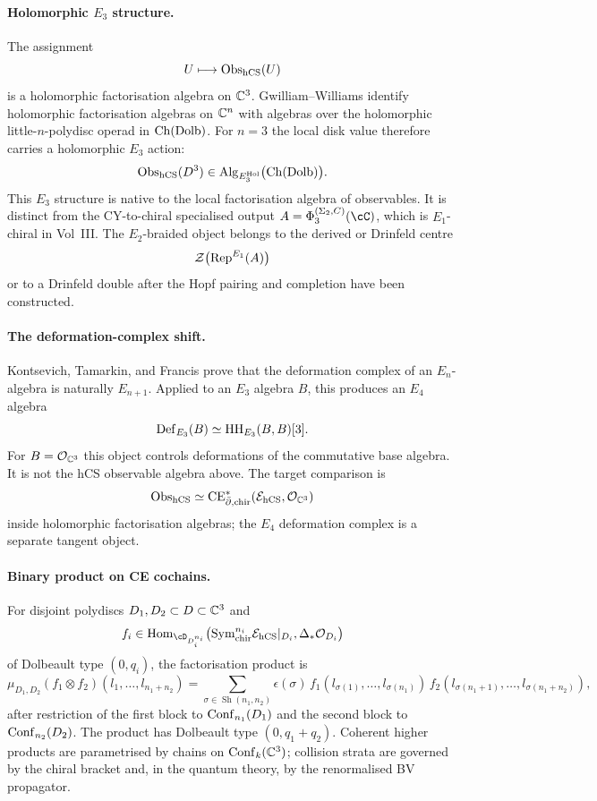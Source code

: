 \paragraph{Holomorphic $E_3$ structure.}
The assignment
\[
  U\longmapsto \mathrm{Obs}_{\mathrm{hCS}}(U)
\]
is a holomorphic factorisation algebra on $\mathbb{C}^3$.  Gwilliam--Williams
identify holomorphic factorisation algebras on $\mathbb{C}^n$ with algebras over
the holomorphic little-$n$-polydisc operad in $\mathrm{Ch}(\mathrm{Dolb})$.  For $n=3$
the local disk value therefore carries a holomorphic $E_3$ action:
\[
  \mathrm{Obs}_{\mathrm{hCS}}(D^3)\in
  \mathrm{Alg}_{E^{\mathrm{Hol}}_3}\bigl(\mathrm{Ch}(\mathrm{Dolb})\bigr).
\]
This $E_3$ structure is native to the local factorisation algebra of
observables.  It is distinct from the CY-to-chiral specialised output
$A=\Phi_3^{(\Sigma_2,C)}(\cC)$, which is $E_1$-chiral in Vol~III.  The
$E_2$-braided object belongs to the derived or Drinfeld centre
\[
  \mathcal{Z}\bigl(\mathrm{Rep}^{E_1}(A)\bigr)
\]
or to a Drinfeld double after the Hopf pairing and completion have been
constructed.

\paragraph{The deformation-complex shift.}
Kontsevich, Tamarkin, and Francis prove that the deformation complex of an
$E_n$-algebra is naturally $E_{n+1}$.  Applied to an $E_3$ algebra $B$,
this produces an $E_4$ algebra
\[
  \mathrm{Def}_{E_3}(B)\simeq \mathrm{HH}_{E_3}(B,B)[3].
\]
For $B=\mathcal{O}_{\mathbb{C}^3}$ this object controls deformations of the commutative
base algebra.  It is not the hCS observable algebra above.  The
target comparison is
\[
  \mathrm{Obs}_{\mathrm{hCS}}
  \simeq
  \mathrm{CE}^*_{\bar\partial,\mathrm{chir}}(\mathcal{E}_{\mathrm{hCS}},\mathcal{O}_{\mathbb{C}^3})
\]
inside holomorphic factorisation algebras; the $E_4$ deformation complex
is a separate tangent object.

\paragraph{Binary product on CE cochains.}
For disjoint polydiscs $D_1,D_2\subset D\subset\mathbb{C}^3$ and
\[
 f_i\in
 \Hom_{\cD_{D_i^{n_i}}}
 \bigl(\Sym^{n_i}_{\chir}\cE_{\hCS}|_{D_i},\Delta_*\cO_{D_i}\bigr)
\]
of Dolbeault type $(0,q_i)$, the factorisation product is
\[
  \mu_{D_1,D_2}(f_1\otimes f_2)(l_1,\ldots,l_{n_1+n_2})
  =
  \sum_{\sigma\in \operatorname{Sh}(n_1,n_2)}
  \epsilon(\sigma)\,
  f_1(l_{\sigma(1)},\ldots,l_{\sigma(n_1)})\,
  f_2(l_{\sigma(n_1+1)},\ldots,l_{\sigma(n_1+n_2)}),
\]
after restriction of the first block to $\mathrm{Conf}_{n_1}(D_1)$ and the
second block to $\mathrm{Conf}_{n_2}(D_2)$.  The product has Dolbeault type
$(0,q_1+q_2)$.  Coherent higher products are parametrised by chains on
$\mathrm{Conf}_k(\mathbb{C}^3)$; collision strata are governed by the chiral bracket and,
in the quantum theory, by the renormalised BV propagator.

